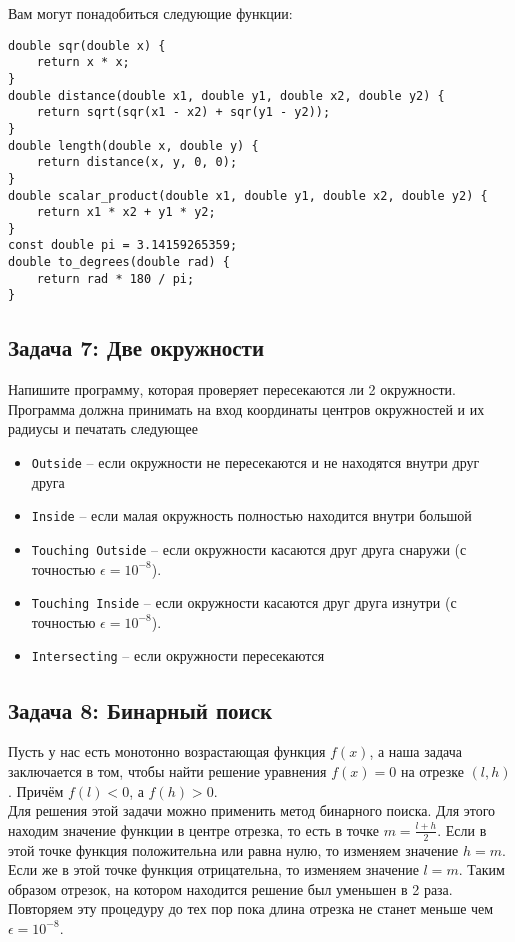 \documentclass{article}
\begin{document}
Вам могут понадобиться следующие функции:
\begin{lstlisting}
double sqr(double x) {
    return x * x;
}
double distance(double x1, double y1, double x2, double y2) {
    return sqrt(sqr(x1 - x2) + sqr(y1 - y2));
}
double length(double x, double y) {
    return distance(x, y, 0, 0);
}
double scalar_product(double x1, double y1, double x2, double y2) {
    return x1 * x2 + y1 * y2;
}
const double pi = 3.14159265359;
double to_degrees(double rad) {
    return rad * 180 / pi;
}
\end{lstlisting}


\subsection*{Задача 7: Две окружности}
Напишите программу, которая проверяет пересекаются ли 2 окружности. Программа должна принимать на вход координаты центров окружностей и их радиусы и печатать следующее
\begin{itemize}
\item \texttt{Outside} -- если окружности не пересекаются и не находятся внутри друг друга
\item \texttt{Inside} -- если малая окружность полностью находится внутри большой
\item \texttt{Touching Outside} -- если окружности касаются друг друга снаружи (с точностью $\epsilon = 10^{-8}$).
\item \texttt{Touching Inside} -- если окружности касаются друг друга изнутри (с точностью $\epsilon = 10^{-8}$).
\item \texttt{Intersecting} -- если окружности пересекаются
\end{itemize}




\subsection*{Задача 8: Бинарный поиск} 
Пусть у нас есть монотонно возрастающая функция $f(x)$, а наша задача заключается в том, чтобы найти решение уравнения $f(x) = 0$ на отрезке $(l, h)$. Причём $f(l) < 0$, а $f(h) > 0$. \\

Для решения этой задачи можно применить метод бинарного поиска. Для этого находим значение функции в центре отрезка, то есть в точке $m = \frac{l + h}{2}$. Если в этой точке функция положительна или равна нулю, то изменяем значение $h = m$. Если же в этой точке функция отрицательна, то изменяем значение $l = m$. Таким образом отрезок, на котором находится решение был уменьшен в 2 раза. Повторяем эту процедуру до тех пор пока длина отрезка не станет меньше чем $\epsilon = 10^{-8}$.\\
\end{document}
